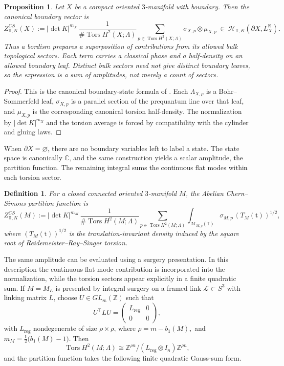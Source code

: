 \documentclass[12pt]{amsart}
\numberwithin{equation}{section}
\newtheorem{prop}[theorem]{Proposition}
\newtheorem{definition}[theorem]{Definition}
\theoremstyle{definition}
\begin{document}
\begin{prop}\cite[Proposition 3.12]{Galviz2}
\label{thm:boundary-vector}
Let $X$ be a compact oriented $3$-manifold with boundary. Then the canonical boundary vector is
$$
Z^{CS}_{\mathbb T,K}(X):=
|\det K|^{m_X}\,
\frac{1}{\#\operatorname{Tors}H^2(X;\Lambda)}
\sum_{p\in \operatorname{Tors}H^2(X;\Lambda)}
\sigma_{X,p}\otimes \mu_{X,p}
\ \in\
\mathcal H_{\mathbb T,K}(\partial X,L_X^{\mathbb R}).
$$
Thus a bordism prepares a superposition of contributions from its allowed bulk topological sectors. Each term carries a classical phase and a half-density on an allowed boundary leaf. Distinct bulk sectors need not give distinct boundary leaves, so the expression is a sum of amplitudes, not merely a count of sectors.
\end{prop}

\begin{proof}
This is the canonical boundary-state formula of \cite{Galviz2}.  Each $\Lambda_{X,p}$ is a Bohr--Sommerfeld leaf, $\sigma_{X,p}$ is a parallel section of the prequantum line over that leaf, and $\mu_{X,p}$ is the corresponding canonical torsion half-density.  The normalization by $|\det K|^{m_X}$ and the torsion average is forced by compatibility with the cylinder and gluing laws.
\end{proof}

When $\partial X=\varnothing$, there are no boundary variables left to label a state. The state space is canonically $\mathbb C$, and the same construction yields a scalar amplitude, the partition function. The remaining integral sums the continuous flat modes within each torsion sector.

\begin{definition}\cite[Definition 4.6]{Galviz2}
\label{def:closed-partition}
For a closed connected oriented $3$-manifold $M$, the Abelian Chern--Simons partition
function is
$$
Z^{CS}_{\mathbb T,K}(M):=
|\det K|^{m_M}\,
\frac{1}{\#\operatorname{Tors}H^2(M;\Lambda)}
\sum_{p\in \operatorname{Tors}H^2(M;\Lambda)}
\int_{\mathcal M_{M,p}(\mathbb T)}
\sigma_{M,p}\,(T_M(\mathrm t))^{1/2},
$$
where $(T_M(\mathrm t))^{1/2}$ is the translation-invariant density induced by the square
root of Reidemeister--Ray--Singer torsion.
\end{definition}

The same amplitude can be evaluated using a surgery presentation. In this description the continuous flat-mode contribution is incorporated into the normalization, while the torsion sectors appear explicitly in a finite quadratic sum. If $M=M_L$ is presented by integral surgery on a framed link $\mathcal L\subset S^3$
with linking matrix $L$, choose $U\in GL_m(\mathbb Z)$ such that
$$
U^\top L U=
\begin{pmatrix}
L_{\mathrm{reg}}&0\\
0&0
\end{pmatrix},
$$
with $L_{\mathrm{reg}}$ nondegenerate of size $\rho\times \rho$, where $\rho=m-b_1(M),$ and $m_M=\frac12\bigl(b_1(M)-1\bigr).$
Then
$$
\operatorname{Tors}H^2(M;\Lambda)\cong
\mathbb Z^{\rho n}/(L_{\mathrm{reg}}\otimes I_n)\mathbb Z^{\rho n},
$$
and the partition function takes the following finite quadratic Gauss-sum form.
\end{document}
